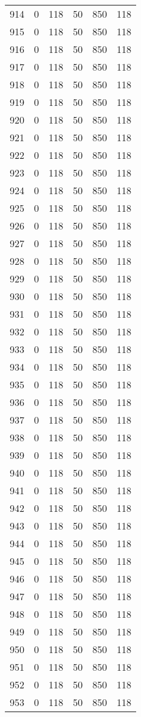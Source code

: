 \documentclass[a4paper]{ctexart}
\begin{document}
\begin{longtable}{p{1cm}|p{2cm}|p{2cm}|p{2cm}|P{2cm}|p{2cm}}
		914&0&118&50&850&118\\
		915&0&118&50&850&118\\
		916&0&118&50&850&118\\
		917&0&118&50&850&118\\
		918&0&118&50&850&118\\
		919&0&118&50&850&118\\
		920&0&118&50&850&118\\
		921&0&118&50&850&118\\
		922&0&118&50&850&118\\
		923&0&118&50&850&118\\
		924&0&118&50&850&118\\
		925&0&118&50&850&118\\
		926&0&118&50&850&118\\
		927&0&118&50&850&118\\
		928&0&118&50&850&118\\
		929&0&118&50&850&118\\
		930&0&118&50&850&118\\
		931&0&118&50&850&118\\
		932&0&118&50&850&118\\
		933&0&118&50&850&118\\
		934&0&118&50&850&118\\
		935&0&118&50&850&118\\
		936&0&118&50&850&118\\
		937&0&118&50&850&118\\
		938&0&118&50&850&118\\
		939&0&118&50&850&118\\
		940&0&118&50&850&118\\
		941&0&118&50&850&118\\
		942&0&118&50&850&118\\
		943&0&118&50&850&118\\
		944&0&118&50&850&118\\
		945&0&118&50&850&118\\
		946&0&118&50&850&118\\
		947&0&118&50&850&118\\
		948&0&118&50&850&118\\
		949&0&118&50&850&118\\
		950&0&118&50&850&118\\
		951&0&118&50&850&118\\
		952&0&118&50&850&118\\
		953&0&118&50&850&118\\

\end{longtable}
\end{document}
